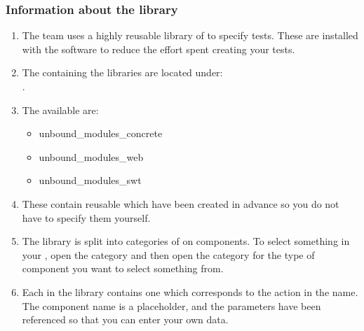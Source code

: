 \subsubsection{Information about the library}
\label{LibraryInformation}
\begin{enumerate}
\item The \app{} team uses a highly reusable library of \gdcases{} to specify tests. These \gdcases{} are installed with the software to reduce the effort spent creating your tests.  
\item The \gdprojects{} containing the \gdcase{} libraries are located under:\\
.

\item The \gdprojects{} available are:
\begin{itemize}
\item unbound\_modules\_concrete
\item unbound\_modules\_web
\item unbound\_modules\_swt
\end{itemize}

\item These \gdprojects{} contain reusable \gdcases{} which have been created in advance so you do not have to specify them yourself.
\item The library is split into categories of  on components. To select something in your \gdaut{}, open the  category and then open the category for the type of component you want to select something from. 

\item Each \gdcase{} in the library contains one \gdstep{} which corresponds to the action in the \gdcase{} name. The component name is a placeholder, and the parameters have been referenced so that you can enter your own data. 

 



\end{enumerate}

